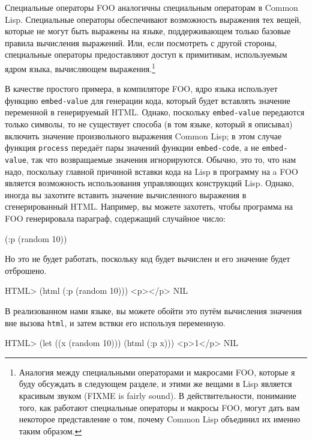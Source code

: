 Специальные операторы FOO аналогичны специальным операторам в Common Lisp. Специальные
операторы обеспечивают возможность выражения тех вещей, которые не могут быть выражены на
языке, поддерживающем только базовые правила вычисления выражений.  Или, если посмотреть с
другой стороны, специальные операторы предоставляют доступ к примитивам, используемым
ядром языка, вычисляющем выражения.\footnote{Аналогия между специальными операторами и
  макросами FOO, которые я буду обсуждать в следующем разделе, и этими же вещами в Lisp
  является красивым звуком (FIXME is fairly sound).  В действительности, понимание того,
  как работают специальные операторы и макросы FOO, могут дать вам некоторое представление
  о том, почему Common Lisp объединил их именно таким образом.}

В качестве простого примера, в компиляторе FOO, ядро языка использует функцию
\lstinline{embed-value} для генерации кода, который будет вставлять значение переменной в
генерируемый HTML.  Однако, поскольку \lstinline{embed-value} передаются только символы, то не
существует способа (в том языке, который я описывал) включить значение произвольного
выражения Common Lisp; в этом случае функция \lstinline{process} передаёт пары значений функции
\lstinline{embed-code}, а не \lstinline{embed-value}, так что возвращаемые значения игнорируются.
Обычно, это то, что нам надо, поскольку главной причиной вставки кода на Lisp в программу
на a FOO является возможность использования управляющих конструкций Lisp.  Однако, иногда
вы захотите вставить значение вычисленного выражения в сгенерированный HTML.  Например, вы
можете захотеть, чтобы программа на FOO генерировала параграф, содержащий случайное число:

\begin{myverb}
(:p (random 10))
\end{myverb}

Но это не будет работать, поскольку код будет вычислен и его значение будет отброшено.

\begin{myverb}
HTML> (html (:p (random 10)))
<p></p>
NIL
\end{myverb}

В реализованном нами языке, вы можете обойти это путём вычисления значения вне вызова
\lstinline{html}, и затем вствки его используя переменную.

\begin{myverb}
HTML> (let ((x (random 10))) (html (:p x)))
<p>1</p>
NIL
\end{myverb}

